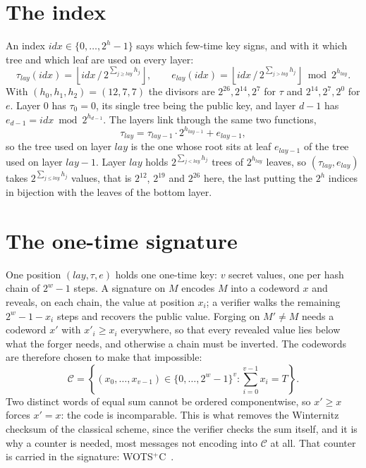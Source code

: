 \documentclass[11pt]{article}
\theoremstyle{definition}
\theoremstyle{plain}
\theoremstyle{remark}
\newcommand{\idx}{\mathit{idx}}
\newcommand{\lay}{\mathit{lay}}
\begin{document}
\section{The index}

An index $\idx\in\{0,\ldots,2^h-1\}$ says which few-time key signs, and with it which tree and which leaf are used on every layer:
\[
  \tau_\lay(\idx)=\left\lfloor\idx\,/\,2^{\sum_{j\geq\lay}h_j}\right\rfloor,
  \qquad
  e_\lay(\idx)=\left\lfloor\idx\,/\,2^{\sum_{j>\lay}h_j}\right\rfloor\bmod 2^{h_\lay}.
\]
With $(h_0,h_1,h_2)=(12,7,7)$ the divisors are $2^{26},2^{14},2^{7}$ for $\tau$ and $2^{14},2^{7},2^{0}$ for $e$. Layer $0$ has $\tau_0=0$, its single tree being the public key, and layer $d-1$ has $e_{d-1}=\idx\bmod2^{h_{d-1}}$. The layers link through the same two functions,
\[
  \tau_\lay=\tau_{\lay-1}\cdot2^{h_{\lay-1}}+e_{\lay-1},
\]
so the tree used on layer $\lay$ is the one whose root sits at leaf $e_{\lay-1}$ of the tree used on layer $\lay-1$. Layer $\lay$ holds $2^{\sum_{j<\lay}h_j}$ trees of $2^{h_\lay}$ leaves, so $(\tau_\lay,e_\lay)$ takes $2^{\sum_{j\leq\lay}h_j}$ values, that is $2^{12}$, $2^{19}$ and $2^{26}$ here, the last putting the $2^h$ indices in bijection with the leaves of the bottom layer.

\section{The one-time signature}
\label{sec:ots}

One position $(\lay,\tau,e)$ holds one one-time key: $v$ secret values, one per hash chain of $2^w-1$ steps. A signature on $M$ encodes $M$ into a codeword $x$ and reveals, on each chain, the value at position $x_i$; a verifier walks the remaining $2^w-1-x_i$ steps and recovers the public value. Forging on $M'\neq M$ needs a codeword $x'$ with $x'_i\geq x_i$ everywhere, so that every revealed value lies below what the forger needs, and otherwise a chain must be inverted. The codewords are therefore chosen to make that impossible:
\[
  \mathcal C=\left\{(x_0,\ldots,x_{v-1})\in\{0,\ldots,2^w - 1\}^{v}:\sum_{i=0}^{v-1}x_i=T\right\}.
\]
Two distinct words of equal sum cannot be ordered componentwise, so $x'\geq x$ forces $x'=x$: the code is incomparable. This is what removes the Winternitz checksum of the classical scheme, since the verifier checks the sum itself, and it is why a counter is needed, most messages not encoding into $\mathcal C$ at all. That counter is carried in the signature: WOTS$^+$C~\cite{HK22C}.
\end{document}

